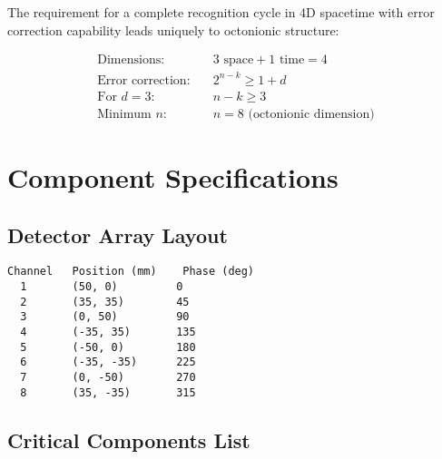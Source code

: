 \documentclass[12pt,twocolumn]{article}
\begin{document}
The requirement for a complete recognition cycle in 4D spacetime with error correction capability leads uniquely to octonionic structure:

\begin{align}
\text{Dimensions:} \quad & 3 \text{ space} + 1 \text{ time} = 4 \\
\text{Error correction:} \quad & 2^{n-k} \geq 1 + d \\
\text{For } d = 3: \quad & n - k \geq 3 \\
\text{Minimum } n: \quad & n = 8 \text{ (octonionic dimension)}
\end{align}

\section{Component Specifications}

\subsection{Detector Array Layout}

\begin{verbatim}
Channel   Position (mm)    Phase (deg)
  1       (50, 0)         0
  2       (35, 35)        45
  3       (0, 50)         90
  4       (-35, 35)       135
  5       (-50, 0)        180
  6       (-35, -35)      225
  7       (0, -50)        270
  8       (35, -35)       315
\end{verbatim}

\subsection{Critical Components List}
\end{document}
